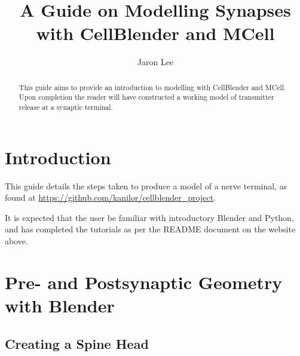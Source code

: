\documentclass[twoside,a4paper]{refart}
\title{A Guide on Modelling Synapses with CellBlender and MCell}
\author{Jaron Lee}
\date{}
\begin{document}
\maketitle

\begin{abstract}
This guide aims to provide an introduction to modelling with CellBlender and MCell. Upon completion the reader will have constructed a working model of transmitter release at a synaptic terminal.
\end{abstract}

\newpage


\section{Introduction}
This guide details the steps taken to produce a model of a nerve terminal, as found at \url{https://github.com/kanilor/cellblender_project}.

It is expected that the user be familiar with introductory Blender and Python, and has completed the tutorials as per the README document on the website above.

\section{Pre- and Postsynaptic Geometry with Blender}

\subsection{Creating a Spine Head}
\end{document}

